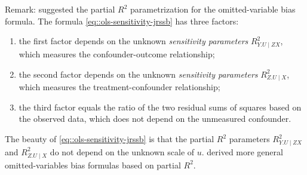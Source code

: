 Remark: \citet{cinelli2020making} suggested the partial $R^2$ parametrization for the omitted-variable bias formula. 
The formula \eqref{eq::ols-sensitivity-jrssb} has three factors: 
\begin{enumerate}[label=(F\arabic*), ref=F\arabic*]
\item
the first factor depends on the unknown {\it sensitivity parameters} $R^2_{Y.U\mid ZX} $, which measures the confounder-outcome relationship;
\item
the second factor depends on the unknown {\it sensitivity parameters} $R^2_{Z.U\mid X}$, which measures the treatment-confounder relationship;
\item
the third factor equals the ratio of the two residual sums of squares based on the observed data, which does not depend on the unmeasured confounder. 
\end{enumerate}
The beauty of \eqref{eq::ols-sensitivity-jrssb} is that the partial $R^2$ parameters $R^2_{Y.U\mid ZX} $ and $R^2_{Z.U\mid X}$ do not depend on the unknown scale of $u$. 
\citet{zhang2022interpretable} derived more general omitted-variables bias formulas based on partial $R^2$.



